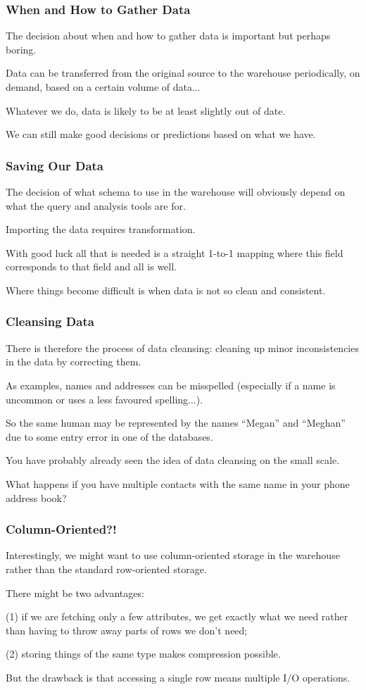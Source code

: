 \begin{frame}
\frametitle{When and How to Gather Data}

The decision about when and how to gather data is important but perhaps boring. 

Data can be transferred from the original source to the warehouse periodically, on demand, based on a certain volume of data...

Whatever we do, data is likely to be at least slightly out of date.

We can still make good decisions or predictions based on what we have.

\end{frame}


\begin{frame}
\frametitle{Saving Our Data}

The decision of what schema to use in the warehouse will obviously depend on what the query and analysis tools are for. 

Importing the data requires transformation. 

With good luck all that is needed is a straight 1-to-1 mapping where this field corresponds to that field and all is well.

Where things become difficult is when data is not so clean and consistent.

\end{frame}

\begin{frame}
\frametitle{Cleansing Data}

There is therefore the process of \alert{data cleansing}: cleaning up minor inconsistencies in the data by correcting them. 

As examples, names and addresses can be misspelled (especially if a name is uncommon or uses a less favoured spelling...). 

So the same human may be represented by the names ``Megan'' and ``Meghan'' due to some entry error in one of the databases. 

You have probably already seen the idea of data cleansing on the small scale.

What happens if you have multiple contacts with the same name in your phone address book?

\end{frame}

\begin{frame}
\frametitle{Column-Oriented?!}

Interestingly, we might want to use column-oriented storage in the warehouse rather than the standard row-oriented storage. 

There might be two advantages: 

(1) if we are fetching only a few attributes, we get exactly what we need rather than having to throw away parts of rows we don't need; 

(2) storing things of the same type makes compression possible. 

But the drawback is that accessing a single row means multiple I/O operations. 


\end{frame}

